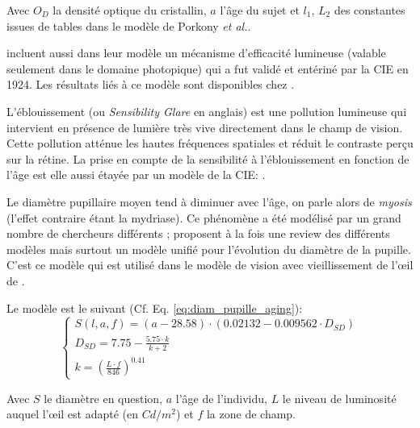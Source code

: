 	\par Avec $O_D$ la densité optique du cristallin, $a$ l'âge du sujet et $l_1$, $L_2$ des constantes issues de tables dans le modèle de Porkony \textit{et al.}.
	
	
	\par \citep{mantiuk_human_2015} incluent aussi dans leur modèle un mécanisme d'efficacité lumineuse (valable seulement dans le domaine photopique) qui a fut validé et entériné par la CIE en 1924. Les résultats liés à ce modèle sont disponibles chez \citep{sagawa_spectral_2001}.
	
	\par L'éblouissement (ou \textit{Sensibility Glare} en anglais) est une pollution lumineuse qui intervient en présence de lumière très vive directement dans le champ de vision. Cette pollution atténue les hautes fréquences spatiales et réduit le contraste perçu sur la rétine. La prise en compte de la sensibilité à l'éblouissement en fonction de l'âge est elle aussi étayée par un modèle de la CIE: \citep{vos_cie_1999}.
	
	\par Le diamètre pupillaire moyen tend à diminuer avec l'âge, on parle alors de \textit{myosis} (l'effet contraire étant la mydriase). Ce phénomène a été modélisé par un grand nombre de chercheurs différents ; \citep{watson_unified_2012} proposent à la fois une review des différents modèles mais surtout un modèle unifié pour l'évolution du diamètre de la pupille. C'est ce modèle qui est utilisé dans le modèle de vision avec vieillissement de l'œil de \citep{mantiuk_human_2015}.
	
	\par Le modèle est le suivant (Cf. Eq. \ref{eq:diam_pupille_aging}):
	\begin{equation}
		\begin{cases}
		S(l,a,f) = (a-28.58) \cdot (0.02132-0.009562 \cdot D_{SD})\\
		D_{SD} = 7.75 - \frac{5.75 \cdot k}{k+2}\\
		k = \left( \frac{L \cdot f}{846} \right)^{0.41}
		\end{cases}
		\label{eq:diam_pupille_aging}
	\end{equation}
	
	\par Avec $S$ le diamètre en question, $a$ l'âge de l'individu, $L$ le niveau de luminosité auquel l'œil est adapté (en $Cd/m^2$) et $f$ la zone de champ.
	
